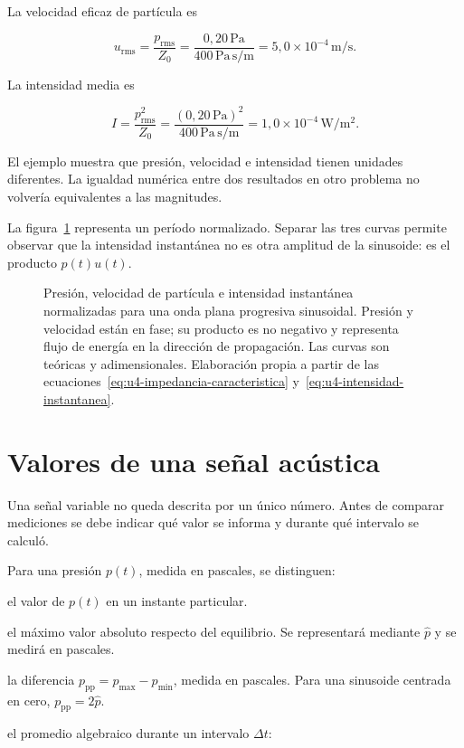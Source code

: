 La velocidad eficaz de partícula es

\[
    u_\mathrm{rms}
      =\frac{p_\mathrm{rms}}{Z_0}
      =\frac{0{,}20\,\text{Pa}}
             {400\,\text{Pa}\,\text{s}/\text{m}}
      =5{,}0\times10^{-4}\,\text{m}/\text{s}.
\]

La intensidad media es

\[
    I=\frac{p_\mathrm{rms}^2}{Z_0}
      =\frac{(0{,}20\,\text{Pa})^2}
             {400\,\text{Pa}\,\text{s}/\text{m}}
      =1{,}0\times10^{-4}\,\text{W}/\text{m}^2.
\]

El ejemplo muestra que presión, velocidad e intensidad tienen unidades
diferentes. La igualdad numérica entre dos resultados en otro problema no
volvería equivalentes a las magnitudes.

La figura~\ref{fig:u4-presion-velocidad-intensidad} representa un período
normalizado. Separar las tres curvas permite observar que la intensidad
instantánea no es otra amplitud de la sinusoide: es el producto \(p(t)u(t)\).

\begin{figure}[!htbp]
    \centering
    
    \caption{Presión, velocidad de partícula e intensidad instantánea
    normalizadas para una onda plana progresiva sinusoidal. Presión y velocidad
    están en fase; su producto es no negativo y representa flujo de energía en
    la dirección de propagación. Las curvas son teóricas y adimensionales.
    Elaboración propia a partir de las
    ecuaciones~\eqref{eq:u4-impedancia-caracteristica}
    y~\eqref{eq:u4-intensidad-instantanea}.}
    \label{fig:u4-presion-velocidad-intensidad}
\end{figure}

\section{Valores de una señal acústica}
\label{sec:u4-valores-senal}

Una señal variable no queda descrita por un único número. Antes de comparar
mediciones se debe indicar qué valor se informa y durante qué intervalo se
calculó.

Para una presión \(p(t)\), medida en pascales, se distinguen:

\begin{description}[style=nextline]
    \item[\textbf{Valor instantáneo:}]
    el valor de \(p(t)\) en un instante particular.

    \item[\textbf{Amplitud de pico:}]
    el máximo valor absoluto respecto del equilibrio. Se representará mediante
    \(\hat p\) y se medirá en pascales.

    \item[\textbf{Valor pico a pico:}]
    la diferencia \(p_\mathrm{pp}=p_{\max}-p_{\min}\), medida en pascales.
    Para una sinusoide centrada en cero, \(p_\mathrm{pp}=2\hat p\).

    \item[\textbf{Valor medio:}]
    el promedio algebraico durante un intervalo \(\Delta t\):
\end{description}


